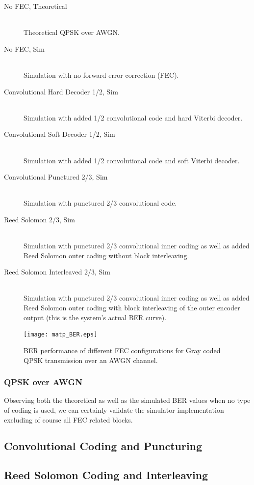 \documentclass[paper=a4, fontsize=11pt]{scrartcl}	%
\numberwithin{equation}{section}		%
\numberwithin{figure}{section}			%
\numberwithin{table}{section}			%
\begin{document}
\begin{description}

  \item[No FEC, Theoretical] \hfill \\
  Theoretical QPSK over AWGN.
  \item[No FEC, Sim] \hfill \\
  Simulation with no forward error correction (FEC).
  \item[Convolutional Hard Decoder 1/2, Sim] \hfill \\
   Simulation with added 1/2 convolutional code and hard Viterbi decoder.
  \item[Convolutional Soft Decoder 1/2, Sim] \hfill \\
  Simulation with added 1/2 convolutional code and soft Viterbi decoder.
  \item[Convolutional Punctured 2/3, Sim] \hfill \\
  Simulation with punctured 2/3 convolutional code.
  \item[Reed Solomon 2/3, Sim] \hfill \\
  Simulation with punctured 2/3 convolutional inner coding as well as added Reed Solomon outer coding without block interleaving.
  \item[Reed Solomon Interleaved 2/3, Sim] \hfill \\
  Simulation with punctured 2/3 convolutional inner coding as well as added Reed Solomon outer coding with block interleaving of the outer encoder output (this is the system's actual BER curve).

\end{description}

\begin{figure}[htb]
\centering
\texttt{[image: matp\_BER.eps]}
\caption{BER performance of different FEC configurations for Gray coded QPSK transmission over an AWGN channel. }\label{fig:BER}
\end{figure}

\subsubsection{QPSK over AWGN}

Observing both the theoretical as well as the simulated BER values when no type of coding is used, we can certainly validate the simulator implementation excluding of course all FEC related blocks.

\subsection{Convolutional Coding and Puncturing}


\subsection{Reed Solomon Coding and Interleaving}


\end{document}

